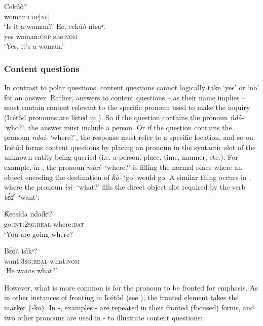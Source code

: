 \ea\label{ex:syn:45}
  \ea
  \gll Cekú{ô}? \\
woman:\textsc{cop[nf]}    \\
  \glt ‘Is it a woman?’    
  \ex
  \gll Ee, cekúó     ntsaᵃ. \\
     yes woman:\textsc{cop}   she:\textsc{nom}    \\
  \glt ‘Yes, it’s a woman.’
  \z
\z





\subsubsection{Content questions}\label{sec:10.4.3}

In contrast to polar questions, content questions cannot logically take ‘yes’ or ‘no’ for an answer. Rather, answers to content questions – as their name implies – must contain content relevant to the specific  pronoun used to make the inquiry (Icétôd  pronouns are listed in ). So if the question contains the pronoun \textit{ǹdò-} ‘who?’, the answer must include a person. Or if the question contains the pronoun \textit{ndaí-} ‘where?’, the response must refer to a specific location, and so on. Icétôd forms content questions by placing an  pronoun in the syntactic slot of the unknown entity being queried (i.e. a person, place, time, manner, etc.). For example, in , the  pronoun \textit{ndaí-} ‘where?’ is filling the normal place where an object encoding the destination of \textit{ƙà-} ‘go’ would go. A similar thing occurs in , where the pronoun \textit{ìsì-} ‘what?’ fills the direct object slot required by the verb \textit{b\'{ɛ}ɗ-} ‘want’:




\ea\label{ex:syn:46}
\gll Ƙeesída     ndaíkᵉ? \\
go:\textsc{int:2sg:real}   where:\textsc{dat}    \\
\glt ‘You are going where? 
\z




\ea\label{ex:syn:47}
\gll B\'{ɛ}ɗá       ìsìkᵃ? \\
want:\textsc{3sg:real}   what:\textsc{nom}    \\
\glt ‘He wants what?’ 
\z


However, what is more common is for the  pronoun to be fronted for emphasis. As in other instances of fronting in Icétôd (see ), the fronted element takes the  marker \{-ko\}. In -, examples - are repeated in their fronted (focused) forms, and two other  pronouns are used in - to illustrate content questions:



